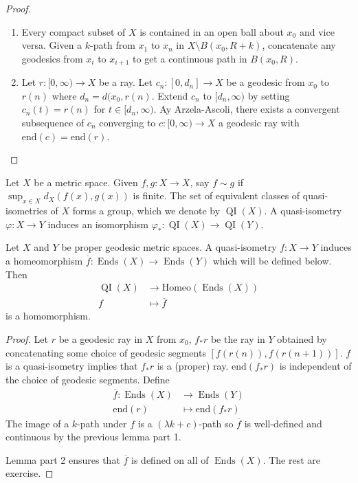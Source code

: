 \documentclass[a4paper]{article}
\DeclareMathOperator{\Ends}{Ends} %
\DeclareMathOperator{\QI}{QI} %
\begin{document}
\begin{proof}\leavevmode
  \begin{enumerate}
  \item Every compact subset of \(X\) is contained in an open ball about \(x_0\) and vice versa. Given a \(k\)-path from \(x_1\) to \(x_n\) in \(X \setminus B(x_0, R + k)\), concatenate any geodesics from \(x_i\) to \(x_{i + 1}\) to get a continuous path in \(B(x_0, R)\).
  \item Let \(r: [0, \infty) \to X\) be a ray. Let \(c_n: [0, d_n] \to X\) be a geodesic from \(x_0\) to \(r(n)\) where \(d_n = d(x_0, r(n)\). Extend \(c_n\) to \([d_n, \infty)\) by setting \(c_n(t) = r(n)\) for \(t \in [d_n, \infty)\). Ay Arzela-Ascoli, there exists a convergent subsequence of \(c_n\) converging to \(c: [0, \infty) \to X\) a geodesic ray with \(\mathrm{end}(c) = \mathrm{end}(r)\).
  \end{enumerate}
\end{proof}

Let \(X\) be a metric space. Given \(f, g: X \to X\), say \(f \sim g\) if \(\sup_{x \in X} d_X(f(x), g(x))\) is finite. The set of equivalent classes of quasi-isometries of \(X\) forms a group, which we denote by \(\QI(X)\). A quasi-isometry \(\varphi: X \to Y\) induces an isomorphism \(\varphi_*: \QI(X) \to \QI(Y)\).

\begin{proposition}
  Let \(X\) and \(Y\) be proper geodesic metric spaces. A quasi-isometry \(f: X \to Y\) induces a homeomorphism \(\overline f: \Ends(X) \to \Ends(Y)\) which will be defined below. Then
  \begin{align*}
    \QI(X) &\to \mathrm{Homeo}(\Ends(X)) \\
    f &\mapsto \overline f
  \end{align*}
  is a homomorphism.
\end{proposition}

\begin{proof}
  Let \(r\) be a geodesic ray in \(X\) from \(x_0\), \(f_* r\) be the ray in \(Y\) obtained by concatenating some choice of geodesic segments \([f(r(n)), f(r(n + 1))]\). \(f\) is a quasi-isometry implies that \(f_*r\) is a (proper) ray. \(\mathrm{end}(f_*r)\) is independent of the choice of geodesic segments. Define
  \begin{align*}
    \overline f: \Ends(X) &\to \Ends(Y) \\
    \mathrm{end}(r) &\mapsto \mathrm{end}(f_*r)
  \end{align*}
  The image of a \(k\)-path under \(f\) is a \((\lambda k + c)\)-path so \(\overline f\) is well-defined and continuous by the previous lemma part 1.

  Lemma part 2 ensures that \(\overline f\) is defined on all of \(\Ends(X)\). The rest are exercise.
\end{proof}
\end{document}
